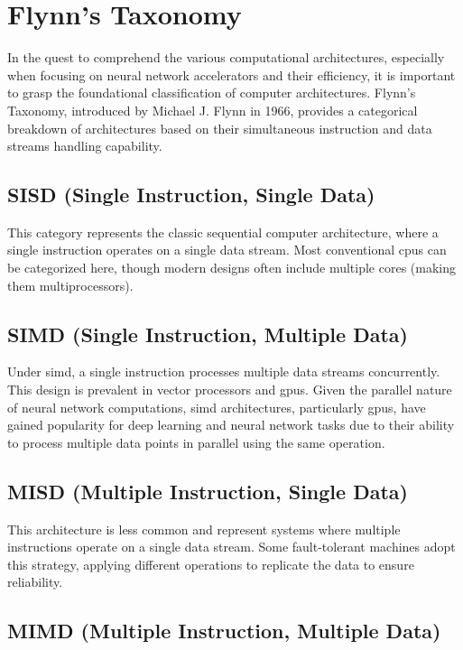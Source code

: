 \section{Flynn's Taxonomy}

In the quest to comprehend the various computational architectures, especially when focusing on neural network accelerators and their efficiency, it is important to grasp the foundational classification of computer architectures. Flynn's Taxonomy, introduced by Michael J. Flynn in 1966, provides a categorical breakdown of architectures based on their simultaneous instruction and data streams handling capability.

\subsection*{SISD (Single Instruction, Single Data)}

This category represents the classic sequential computer architecture, where a single instruction operates on a single data stream. Most conventional \glspl{cpu} can be categorized here, though modern designs often include multiple cores (making them multiprocessors).

\subsection*{SIMD (Single Instruction, Multiple Data)}

Under \gls{simd}, a single instruction processes multiple data streams concurrently. This design is prevalent in vector processors and \glspl{gpu}. Given the parallel nature of neural network computations, \gls{simd} architectures, particularly \glspl{gpu}, have gained popularity for deep learning and neural network tasks due to their ability to process multiple data points in parallel using the same operation.

\subsection*{MISD (Multiple Instruction, Single Data)}

This architecture is less common and represent systems where multiple instructions operate on a single data stream. Some fault-tolerant machines adopt this strategy, applying different operations to replicate the data to ensure reliability.

\subsection*{MIMD (Multiple Instruction, Multiple Data)}

